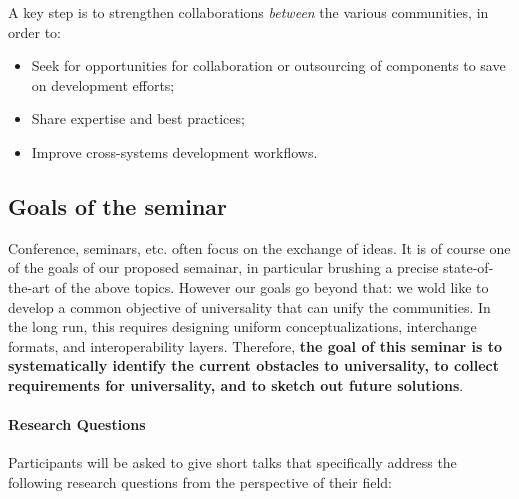 A key step is to strengthen collaborations \emph{between} the various
communities, in order to:
\begin{itemize}
\item Seek for opportunities for collaboration or outsourcing of
  components to save on development efforts;
\item Share expertise and best practices;
\item Improve cross-systems development workflows.
\end{itemize}


\subsection{Goals of the seminar}

Conference, seminars, etc. often focus on the exchange of ideas. It is
of course one of the goals of our proposed semainar, in particular
brushing a precise state-of-the-art of the above topics. 
However our goals go beyond that: we wold like to develop a common
objective of universality that can unify the communities. In the long run, this requires designing uniform conceptualizations, interchange formats, and interoperability layers.
Therefore, \textbf{the goal of this seminar is to systematically identify the current obstacles to universality, to collect requirements for universality, and to sketch out future solutions}.

\paragraph{Research Questions}
Participants will be asked to give short talks that specifically address the following research questions from the perspective of their field:

